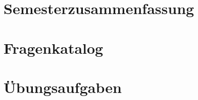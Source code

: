 \documentclass[11pt, oneside]{report}
\begin{document}
	

	\clearpage

	\thispagestyle{empty}

	
	

	\tableofcontents

	\clearpage


	\part{Semesterzusammenfassung}

	
	
	
	
	

	

	\part{Fragenkatalog}
	
	
	
	\part{Übungsaufgaben}
	
	
	

	\pagestyle{empty}
	\setcounter{page}{1}


\end{document}
